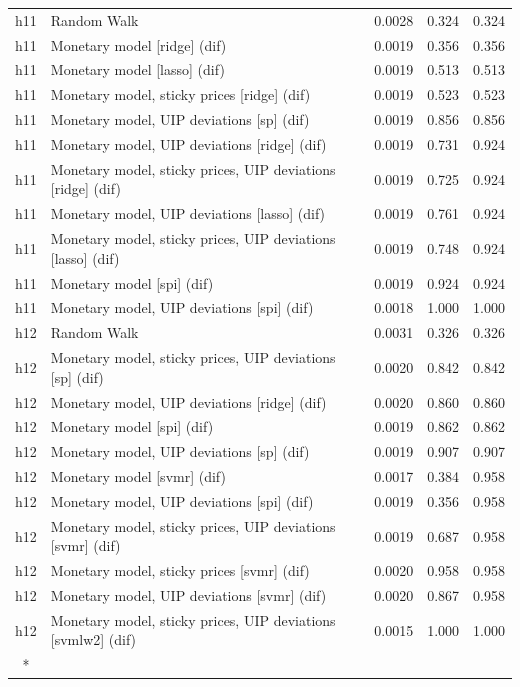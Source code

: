 \begin{ThreePartTable}
\begin{longtable}[t]{cp{5.5cm}ccc}
\addlinespace
h11 & \raggedright Random Walk & 0.0028 & 0.324 & 0.324\\
h11 & \raggedright Monetary model [ridge] (dif) & 0.0019 & 0.356 & 0.356\\
h11 & \raggedright Monetary model [lasso] (dif) & 0.0019 & 0.513 & 0.513\\
h11 & \raggedright Monetary model, sticky prices [ridge] (dif) & 0.0019 & 0.523 & 0.523\\
h11 & \raggedright Monetary model, UIP deviations [sp] (dif) & 0.0019 & 0.856 & 0.856\\
h11 & \raggedright Monetary model, UIP deviations [ridge] (dif) & 0.0019 & 0.731 & 0.924\\
h11 & \raggedright Monetary model, sticky prices, UIP deviations [ridge] (dif) & 0.0019 & 0.725 & 0.924\\
h11 & \raggedright Monetary model, UIP deviations [lasso] (dif) & 0.0019 & 0.761 & 0.924\\
h11 & \raggedright Monetary model, sticky prices, UIP deviations [lasso] (dif) & 0.0019 & 0.748 & 0.924\\
h11 & \raggedright Monetary model [spi] (dif) & 0.0019 & 0.924 & 0.924\\
h11 & \raggedright Monetary model, UIP deviations [spi] (dif) & 0.0018 & 1.000 & 1.000\\
\addlinespace
h12 & \raggedright Random Walk & 0.0031 & 0.326 & 0.326\\
h12 & \raggedright Monetary model, sticky prices, UIP deviations [sp] (dif) & 0.0020 & 0.842 & 0.842\\
h12 & \raggedright Monetary model, UIP deviations [ridge] (dif) & 0.0020 & 0.860 & 0.860\\
h12 & \raggedright Monetary model [spi] (dif) & 0.0019 & 0.862 & 0.862\\
h12 & \raggedright Monetary model, UIP deviations [sp] (dif) & 0.0019 & 0.907 & 0.907\\
h12 & \raggedright Monetary model [svmr] (dif) & 0.0017 & 0.384 & 0.958\\
h12 & \raggedright Monetary model, UIP deviations [spi] (dif) & 0.0019 & 0.356 & 0.958\\
h12 & \raggedright Monetary model, sticky prices, UIP deviations [svmr] (dif) & 0.0019 & 0.687 & 0.958\\
h12 & \raggedright Monetary model, sticky prices [svmr] (dif) & 0.0020 & 0.958 & 0.958\\
h12 & \raggedright Monetary model, UIP deviations [svmr] (dif) & 0.0020 & 0.867 & 0.958\\
h12 & \raggedright Monetary model, sticky prices, UIP deviations [svmlw2] (dif) & 0.0015 & 1.000 & 1.000\\*
\end{longtable}
\end{ThreePartTable}
\endgroup{}
